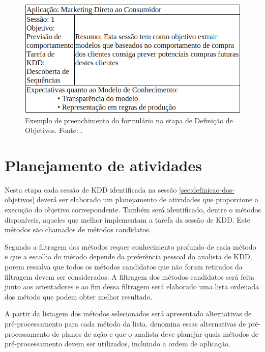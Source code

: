 \documentclass[diss,capa]{texufpel}
\begin{document}
    \begin{figure}[htbp]
      \centering \includegraphics[scale=.4]{imagens/formulario-etapa-definicao-objetivo.png}
      \caption{Exemplo de preenchimento do formulário na etapa de Definição de Objetivos. Fonte: \cite{goldschmidt2015data}.}
      \label{fig:formulario-etapa-definicao-objetivo}
    \end{figure}
    
    \section{Planejamento de atividades}
    \label{sec:planejamento-de-atividades}
    
    Nesta etapa cada sessão de KDD identificada na sessão \ref{sec:definicao-dos-objetivos} deverá ser elaborado um planejamento de atividades que proporcione a execução do objetivo correspondente. Também será identificado, dentre o métodos disponíveis, aqueles que melhor implementam a tarefa da sessão de KDD. Este métodos são chamados de métodos candidatos.
    
    Segundo \citet{goldschmidt2015data} a filtragem dos métodos requer conhecimento profundo de cada método e que a escolha do método depende da preferência pessoal do analista de KDD, porem ressalva que todos os métodos candidatos que não foram retirados da filtragem devem ser considerados. A filtragem dos métodos candidatos será feita junto aos orientadores e ao fim dessa filtragem será elaborado uma lista ordenada dos método que podem obter melhor resultado.
    
    A partir da listagem dos métodos selecionados será apresentado alternativas de pré-processamento para cada método da lista. \citet{goldschmidt2015data} denomina essas alternativas de pré-processamento de planos de ação e que o analista deve planejar quais métodos de pré-processamento devem ser utilizados, incluindo a ordem de aplicação.
    
\end{document}
